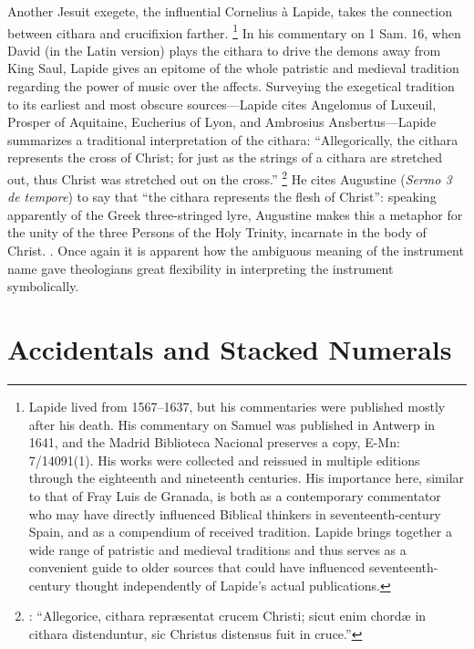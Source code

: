 \documentclass[11pt]{article}
\begin{document}
Another Jesuit exegete, the influential Cornelius à Lapide, takes the connection between cithara and crucifixion farther.%
	\footnote{
Lapide lived from 1567--1637, but his commentaries were published mostly after his death.
His commentary on Samuel was published in Antwerp in 1641, and the Madrid Biblioteca Nacional preserves a copy, E-Mn: 7/14091(1).
His works were collected and reissued in multiple editions through the eighteenth and nineteenth centuries.
His importance here, similar to that of Fray Luis de Granada, is both as a contemporary commentator who may have directly influenced Biblical thinkers in seventeenth-century Spain, and as a compendium of received tradition.
Lapide brings together a wide range of patristic and medieval traditions and thus serves as a convenient guide to older sources that could have influenced seventeenth-century thought independently of Lapide's actual publications.
	}
In his commentary on 1 Sam. 16, when David (in the Latin version) plays the cithara to drive the demons away from King Saul, Lapide gives an epitome of the whole patristic and medieval tradition regarding the power of music over the affects.
Surveying the exegetical tradition to its earliest and most obscure sources---Lapide cites Angelomus of Luxeuil, Prosper of Aquitaine, Eucherius of Lyon, and Ambrosius Ansbertus---Lapide summarizes a traditional interpretation of the cithara:
``Allegorically, the cithara represents the cross of Christ; for just as the strings of a cithara are stretched out, thus Christ was stretched out on the cross.''%
	\footnote{
	\autocite[370]{Lapide:1Samuel}: ``Allegorice, cithara repræsentat crucem Christi; sicut enim chordæ in cithara distenduntur, sic Christus distensus fuit in cruce.''
	}
He cites Augustine (\emph{Sermo 3 de tempore}) to say that ``the cithara represents the flesh of Christ'': speaking apparently of the Greek three-stringed lyre, Augustine makes this a metaphor for the unity of the three Persons of the Holy Trinity, incarnate in the body of Christ.%
	\autocite[370]{Lapide:1Samuel}.
Once again it is apparent how the ambiguous meaning of the instrument name gave theologians great flexibility in interpreting the instrument symbolically.

\section{%
Accidentals and Stacked Numerals
}
\end{document}
